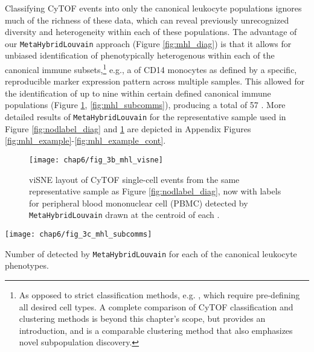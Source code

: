 Classifying CyTOF events into only the canonical leukocyte populations ignores much of the richness of these data, which can reveal previously unrecognized diversity and heterogeneity within each of these populations. The advantage of our \texttt{MetaHybridLouvain} approach (Figure \ref{fig:mhl_diag}) is that it allows for unbiased identification of phenotypically heterogenous \subcommunities{} within each of the canonical immune subsets,\footnote[][-1.5cm]{As opposed to strict classification methods, e.g. \textcite{Lee2017}, which require pre-defining all desired cell types. A complete comparison of CyTOF classification and clustering methods is beyond this chapter's scope, but \textcite{Aghaeepour2013} provides an introduction, and \textcite{Samusik2016} is a comparable clustering method that also emphasizes novel subpopulation discovery.} e.g., a \subcommunity{} of CD14\sups{+} monocytes as defined by a specific, reproducible marker expression pattern across multiple samples. This allowed for the identification of up to nine \subcommunities{} within certain defined canonical immune populations (Figure \ref{fig:mhl_visne}, \ref{fig:mhl_subcomms}), producing a total of 57 \subcommunities{}. More detailed results of \texttt{Me\-ta\-Hy\-brid\-Lou\-vain} for the representative sample used in Figure \ref{fig:nodlabel_diag} and \ref{fig:mhl_visne} are depicted in Appendix Figures \ref{fig:mhl_example}-\ref{fig:mhl_example_cont}.

\begin{figure}[htb]
  \centering
  \texttt{[image: chap6/fig\_3b\_mhl\_visne]}
  \caption[viSNE layout of \texttt{MetaHybridLouvain} \subcommunities{}]{viSNE layout of CyTOF single-cell events from the same representative sample as Figure \ref{fig:nodlabel_diag}, now with labels for peripheral blood mononuclear cell (PBMC) \subcommunities{} detected by \texttt{MetaHybridLouvain} drawn at the centroid of each \subcommunity{}.
  }
  \label{fig:mhl_visne}
\end{figure}
\begin{marginfigure}
  \centering
  \texttt{[image: chap6/fig\_3c\_mhl\_subcomms]}
  \caption[Number of \subcommunities{} detected by \texttt{MetaHybridLouvain} per canonical phenotype]{Number of \subcommunities{} detected by \texttt{MetaHybridLouvain} for each of the canonical leukocyte phenotypes.}
  \label{fig:mhl_subcomms}
\end{marginfigure}

